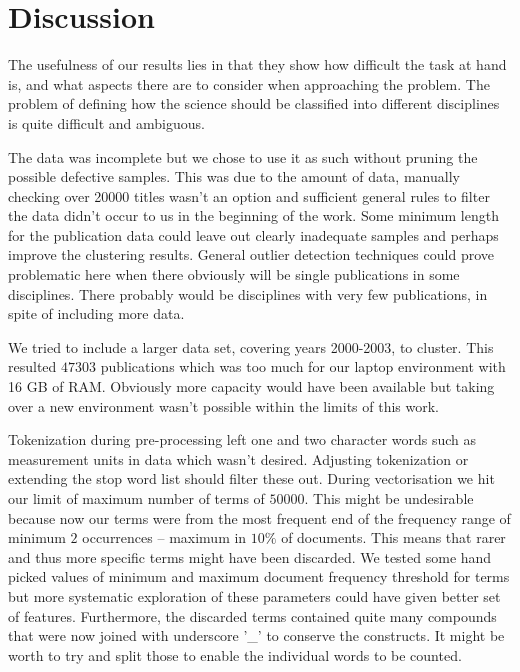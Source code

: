 \chapter{Discussion}
\label{chapter:discussion}

The usefulness of our results lies in that they show how difficult
the task at hand is, and what aspects there are to consider when
approaching the problem.
The problem of defining how the science should be classified into
different disciplines is quite difficult and ambiguous.

The data was incomplete but we chose to use it as such without 
pruning the possible defective samples. This was due to the 
amount of data, manually checking over 20000 titles wasn't an 
option and sufficient general rules to filter the data didn't 
occur to us in the beginning of the work. Some minimum length for 
the publication data could leave out clearly inadequate samples 
and perhaps improve the clustering results. General outlier 
detection techniques \cite{hodge_survey_2004} could prove 
problematic here when there obviously will be single publications 
in some disciplines. There probably would be disciplines with very
few publications, in spite of including more data.

We tried to include a larger data set, covering years 2000-2003, 
to cluster. This resulted $47303$ publications which was too much 
for our laptop environment with 16 GB of RAM. Obviously more 
capacity would have been available but taking over a new 
environment wasn't possible within the limits of this work.

Tokenization during pre-processing left one and two character 
words such as measurement units in data which wasn't desired. 
Adjusting tokenization or extending the stop word list should 
filter these out.
During vectorisation we hit our limit of maximum number of terms 
of $50000$. This might be undesirable because now our terms were
from the most frequent end of the frequency range of minimum $2$ 
occurrences -- maximum in $10 \%$ of documents. This means that 
rarer and thus more specific terms might have been discarded.
We tested some hand picked values of minimum and maximum document 
frequency threshold for terms but more systematic exploration of 
these parameters could have given better set of features.
Furthermore, the discarded terms contained quite many compounds 
that were now joined with underscore '\_' to conserve the 
constructs. It might be worth to try and split those to enable the 
individual words to be counted.

